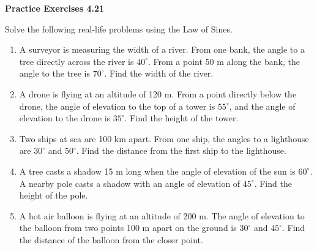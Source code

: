 \vspace{0.3ex}
\noindent\textbf{Practice Exercises 4.21}

\vspace{0.2ex}

Solve the following real-life problems using the Law of Sines.  

\begin{enumerate}
    \item A surveyor is measuring the width of a river. From one bank, the angle to a tree directly across the river is \(40^\circ\). From a point 50 m along the bank, the angle to the tree is \(70^\circ\). Find the width of the river.
    \item A drone is flying at an altitude of 120 m. From a point directly below the drone, the angle of elevation to the top of a tower is \(55^\circ\), and the angle of elevation to the drone is \(35^\circ\). Find the height of the tower.
    \item Two ships at sea are 100 km apart. From one ship, the angles to a lighthouse are \(30^\circ\) and \(50^\circ\). Find the distance from the first ship to the lighthouse.
    \item A tree casts a shadow 15 m long when the angle of elevation of the sun is \(60^\circ\). A nearby pole casts a shadow with an angle of elevation of \(45^\circ\). Find the height of the pole.
    \item A hot air balloon is flying at an altitude of 200 m. The angle of elevation to the balloon from two points 100 m apart on the ground is \(30^\circ\) and \(45^\circ\). Find the distance of the balloon from the closer point.
\end{enumerate}
